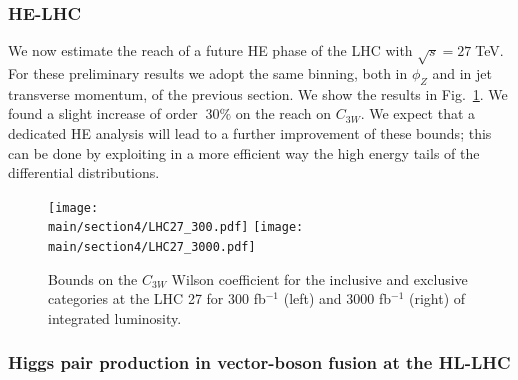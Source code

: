 \documentclass[../report.tex]{subfiles}
\providecommand{\main}{..}
\begin{document}
\subsubsection*{HE-LHC}


We now estimate the reach of a future HE phase of the LHC with
$\sqrt{s}=27\;$TeV. For these preliminary results we adopt the same binning, both in $\phi_Z$ and in jet transverse momentum, of the previous section. We show the results in Fig.~\ref{fig:LHC27}. We found a slight increase of order $~30\%$ on the reach on $C_{3W}$. We expect that a dedicated HE analysis will lead to a further improvement of these bounds; this can be done by exploiting in a more efficient way the high energy tails of the differential distributions.  


  \begin{figure}[h!]
\begin{center}
 \texttt{[image: \\main/section4/LHC27\_300.pdf]}{}\hspace{2cm}
 \texttt{[image: \\main/section4/LHC27\_3000.pdf]}{}
\end{center}
\caption{Bounds on the $C_{3W}$ Wilson coefficient for the inclusive and exclusive categories at the LHC 27 for 300 fb$^{-1}$ (left) and 3000 fb$^{-1}$ (right) of integrated luminosity.}
\label{fig:LHC27}
\end{figure}



\subsubsection{Higgs pair production in vector-boson fusion at the HL-LHC}


\end{document}
